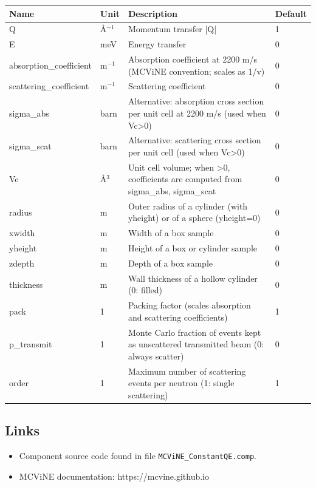 \begin{longtable}{p{}p{}p{}p{}}
\toprule
\textbf{Name} & \textbf{Unit} & \textbf{Description} & \textbf{Default} \\
\midrule
\endhead
Q & \AA{}$^{-1}$ & Momentum transfer |Q| & 1 \\
E & meV & Energy transfer & 0 \\
absorption\_coefficient & m$^{-1}$ & Absorption coefficient at 2200 m/s (MCViNE convention; scales as 1/v) & 0 \\
scattering\_coefficient & m$^{-1}$ & Scattering coefficient & 0 \\
sigma\_abs & barn & Alternative: absorption cross section per unit cell at 2200 m/s (used when Vc\textgreater{}0) & 0 \\
sigma\_scat & barn & Alternative: scattering cross section per unit cell (used when Vc\textgreater{}0) & 0 \\
Vc & \AA{}$^{3}$ & Unit cell volume; when \textgreater{}0, coefficients are computed from sigma\_abs, sigma\_scat & 0 \\
radius & m & Outer radius of a cylinder (with yheight) or of a sphere (yheight=0) & 0 \\
xwidth & m & Width of a box sample & 0 \\
yheight & m & Height of a box or cylinder sample & 0 \\
zdepth & m & Depth of a box sample & 0 \\
thickness & m & Wall thickness of a hollow cylinder (0: filled) & 0 \\
pack & 1 & Packing factor (scales absorption and scattering coefficients) & 1 \\
p\_transmit & 1 & Monte Carlo fraction of events kept as unscattered transmitted beam (0: always scatter) & 0 \\
order & 1 & Maximum number of scattering events per neutron (1: single scattering) & 1 \\
\bottomrule
\end{longtable}

\subsection*{Links}
\begin{itemize}
  \item Component source code found in file \texttt{MCViNE\_ConstantQE.comp}.
  \item MCViNE documentation: https://mcvine.github.io
\end{itemize}

